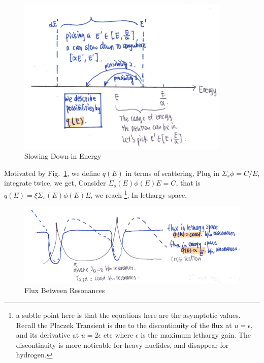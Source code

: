 \documentclass{school-22.211-notes}
\begin{document}
\begin{enumerate}
      \begin{figure}[ht]
        \centering
        \includegraphics[width=4in]{images/sl-d/sl-d-energy.png}
        \caption{Slowing Down in Energy} \label{sl-d-energy}
      \end{figure}

      Motivated by Fig.~\ref{sl-d-energy}, we define $q(E)$ in terms of scattering, 
      Plug in $\Sigma_s \phi = C/E$, integrate twice, we get, 
      Consider $\Sigma_s (E) \phi(E) E = C$, that is $q(E) = \xi \Sigma_s (E) \phi(E) E$, we reach \footnote{a subtle point here is that the equations here are the asymptotic values. Recall the Placzek Transient is due to the discontinuity of the flux at $u = \epsilon$, and its derivative at $u = 2 \epsilon$ etc where $\epsilon$ is the maximum lethargy gain. The discontinuity is more noticable for heavy nuclides, and disappear for hydrogen.}, 
      In lethargy space, 

      \begin{figure}[ht]
        \centering
        \includegraphics[width=6.5in]{images/sl-d/resonance-flux.png}
        \caption{Flux Between Resonances} \label{resonance-flux}
      \end{figure}


\end{enumerate}
\end{document}
